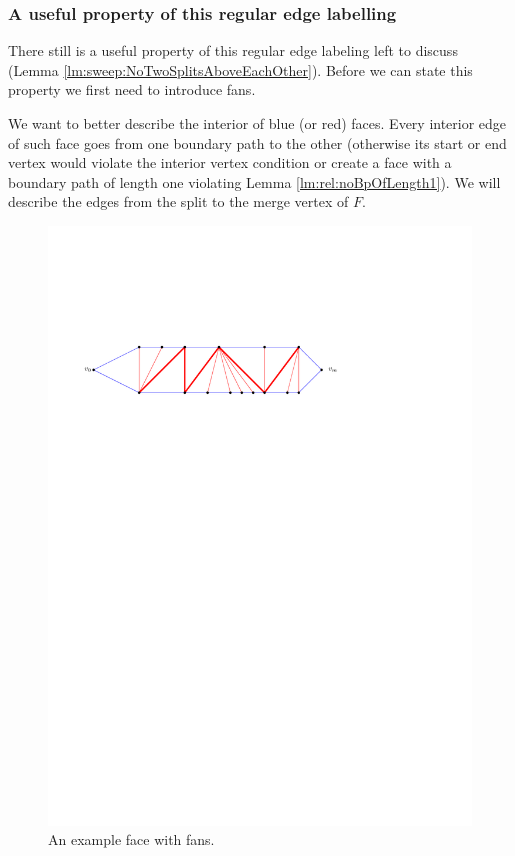   \subsubsection{A useful property of this regular edge labelling}
    There still is a useful property of this regular edge labeling left to discuss (Lemma \ref{lm:sweep:NoTwoSplitsAboveEachOther}). Before we can state this property we first need to introduce fans.

    We want to better describe the interior of blue (or red) faces. Every interior edge of such face goes from one boundary path to the other (otherwise its start or end vertex would violate the interior vertex condition or create a face with a boundary path of length one violating Lemma \ref{lm:rel:noBpOfLength1}). We will describe the edges from the split to the merge vertex of $F$.

    \begin{figure}[t]
      \centering
      \includegraphics[scale=.9]{rectangularDuals/img/fans}
      \caption{An example face with fans.}
      \label{fig:uni:fans}
    \end{figure}

